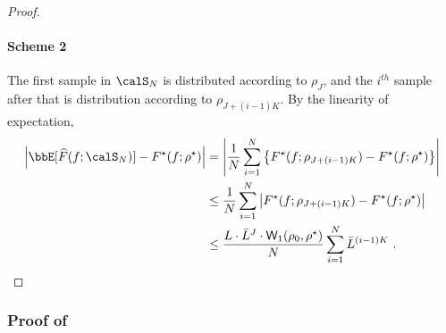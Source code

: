 \documentclass[11pt]{article}
\newcounter{ct}
\begin{document}
\begin{proof}
\paragraph{Scheme 2}
The first sample in \(\calS_{N}\) is distributed according to \(\rho_{J}\), and the \(i^{th}\) sample after that is distribution according to \(\rho_{J + (i - 1)K}\).
By the linearity of expectation,
\begin{align*}
    \left|\bbE[\widehat{F}(f; \calS_{N})] - F^{\star}(f; \rho^{\star})\right| &= \left|\frac{1}{N}\sum_{i=1}^{N} \left\{F^{\star}(f; \rho_{J + (i - 1)K}) - F^{\star}(f; \rho^{\star})\right\}\right| \\
    &\leq \frac{1}{N}\sum_{i=1}^{N}\left|F^{\star}(f; \rho_{J + (i - 1)K}) - F^{\star}(f; \rho^{\star})\right| \\
    &\leq \frac{L \cdot \bar{L}^{J} \cdot \mathsf{W}_{1}(\rho_{0}, \rho^{\star})}{N}\sum_{i=1}^{N} \bar{L}^{(i - 1)K}~.
\end{align*}
\end{proof}

\subsubsection{Proof of }
\label{sec:prf:scheme1-chernoff}
\end{document}
